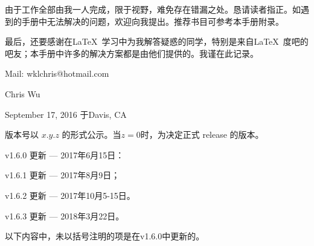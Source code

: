 由于工作全部由我一人完成，限于视野，难免存在错漏之处。恳请读者指正。如遇到的手册中无法解决的问题，欢迎向我提出。推荐书目可参考本手册附录。

最后，还要感谢在\LaTeX\ 学习中为我解答疑惑的同学，特别是来自\LaTeX\ 度吧的吧友；本手册中许多的解决方案都是由他们提供的。我谨在此记录。

\vfill

\begin{flushright}
Mail: wklchris@hotmail.com\dpar

Chris Wu

September 17, 2016 于Davis, CA
\end{flushright}
\clearpage
{}\dpar\dpar

版本号以 $x.y.z$ 的形式公示。当$z=0$时，为决定正式 release 的版本。

v1.6.0 更新 --- 2017年6月15日：

v1.6.1 更新 --- 2017年8月9日；

v1.6.2 更新 --- 2017年10月5-15日。

v1.6.3 更新 --- 2018年3月22日。\dpar

以下内容中，未以括号注明的项是在v1.6.0中更新的。

